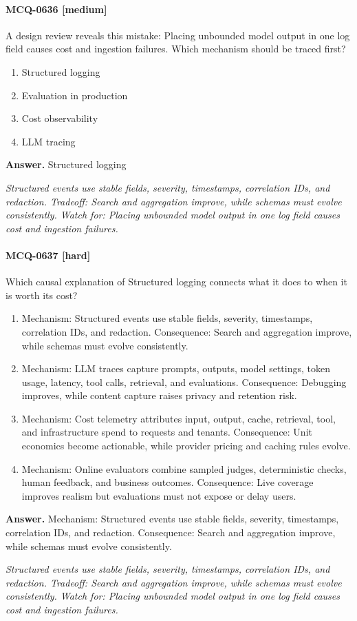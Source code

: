 \paragraph{MCQ-0636 [medium]} A design review reveals this mistake: Placing unbounded model output in one log field causes cost and ingestion failures. Which mechanism should be traced first?
\begin{enumerate}[label=\Alph*.]
\item Structured logging
\item Evaluation in production
\item Cost observability
\item LLM tracing
\end{enumerate}
\noindent\textbf{Answer.} Structured logging
\par\textit{Structured events use stable fields, severity, timestamps, correlation IDs, and redaction. Tradeoff: Search and aggregation improve, while schemas must evolve consistently. Watch for: Placing unbounded model output in one log field causes cost and ingestion failures.}
\paragraph{MCQ-0637 [hard]} Which causal explanation of Structured logging connects what it does to when it is worth its cost?
\begin{enumerate}[label=\Alph*.]
\item Mechanism: Structured events use stable fields, severity, timestamps, correlation IDs, and redaction. Consequence: Search and aggregation improve, while schemas must evolve consistently.
\item Mechanism: LLM traces capture prompts, outputs, model settings, token usage, latency, tool calls, retrieval, and evaluations. Consequence: Debugging improves, while content capture raises privacy and retention risk.
\item Mechanism: Cost telemetry attributes input, output, cache, retrieval, tool, and infrastructure spend to requests and tenants. Consequence: Unit economics become actionable, while provider pricing and caching rules evolve.
\item Mechanism: Online evaluators combine sampled judges, deterministic checks, human feedback, and business outcomes. Consequence: Live coverage improves realism but evaluations must not expose or delay users.
\end{enumerate}
\noindent\textbf{Answer.} Mechanism: Structured events use stable fields, severity, timestamps, correlation IDs, and redaction. Consequence: Search and aggregation improve, while schemas must evolve consistently.
\par\textit{Structured events use stable fields, severity, timestamps, correlation IDs, and redaction. Tradeoff: Search and aggregation improve, while schemas must evolve consistently. Watch for: Placing unbounded model output in one log field causes cost and ingestion failures.}
